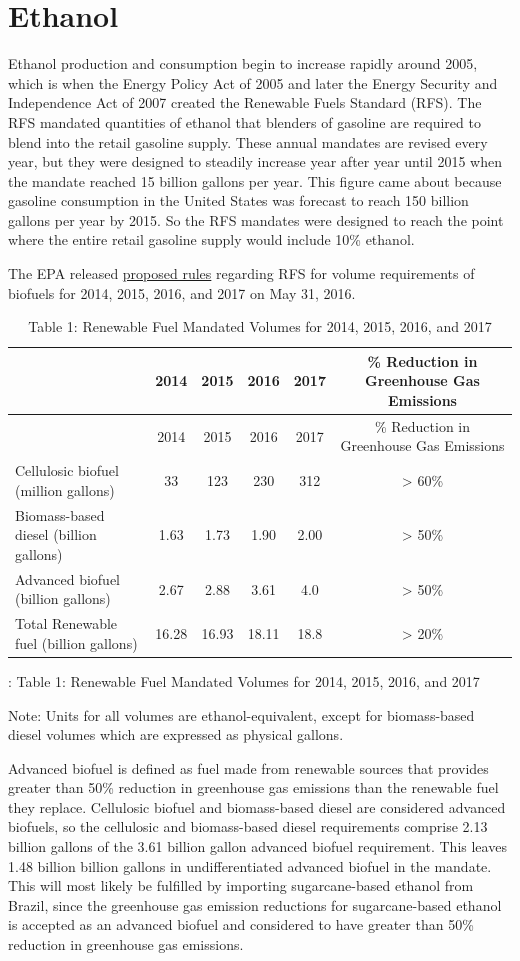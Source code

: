 \documentclass[
]{book}
\begin{document}
\hypertarget{ethanol}{%
\chapter{Ethanol}\label{ethanol}}

Ethanol production and consumption begin to increase rapidly around 2005, which is when the Energy Policy Act of 2005 and later the Energy Security and Independence Act of 2007 created the Renewable Fuels Standard (RFS). The RFS mandated quantities of ethanol that blenders of gasoline are required to blend into the retail gasoline supply. These annual mandates are revised every year, but they were designed to steadily increase year after year until 2015 when the mandate reached 15 billion gallons per year. This figure came about because gasoline consumption in the United States was forecast to reach 150 billion gallons per year by 2015. So the RFS mandates were designed to reach the point where the entire retail gasoline supply would include 10\% ethanol.

The EPA released \href{https://www.epa.gov/renewable-fuel-standard-program/proposed-renewable-fuel-standards-2017-and-biomass-based-diesel}{proposed rules} regarding RFS for volume requirements of biofuels for 2014, 2015, 2016, and 2017 on May 31, 2016.

\begin{longtable}[]{@{}lccccc@{}}
\caption{Table 1: Renewable Fuel Mandated Volumes for 2014, 2015, 2016, and 2017}\tabularnewline
\toprule
& 2014 & 2015 & 2016 & 2017 & \% Reduction in Greenhouse Gas Emissions\tabularnewline
\midrule
\endfirsthead
\toprule
& 2014 & 2015 & 2016 & 2017 & \% Reduction in Greenhouse Gas Emissions\tabularnewline
\midrule
\endhead
Cellulosic biofuel (million gallons) & 33 & 123 & 230 & 312 & \textgreater{} 60\%\tabularnewline
Biomass-based diesel (billion gallons) & 1.63 & 1.73 & 1.90 & 2.00 & \textgreater{} 50\%\tabularnewline
Advanced biofuel (billion gallons) & 2.67 & 2.88 & 3.61 & 4.0 & \textgreater{} 50\%\tabularnewline
Total Renewable fuel (billion gallons) & 16.28 & 16.93 & 18.11 & 18.8 & \textgreater{} 20\%\tabularnewline
\bottomrule
\end{longtable}

: Table 1: Renewable Fuel Mandated Volumes for 2014, 2015, 2016, and 2017

Note: Units for all volumes are ethanol-equivalent, except for biomass-based diesel volumes which are expressed as physical gallons.\textbar{}

Advanced biofuel is defined as fuel made from renewable sources that provides greater than 50\% reduction in greenhouse gas emissions than the renewable fuel they replace. Cellulosic biofuel and biomass-based diesel are considered advanced biofuels, so the cellulosic and biomass-based diesel requirements comprise 2.13 billion gallons of the 3.61 billion gallon advanced biofuel requirement. This leaves 1.48 billion billion gallons in undifferentiated advanced biofuel in the mandate. This will most likely be fulfilled by importing sugarcane-based ethanol from Brazil, since the greenhouse gas emission reductions for sugarcane-based ethanol is accepted as an advanced biofuel and considered to have greater than 50\% reduction in greenhouse gas emissions.
\end{document}
